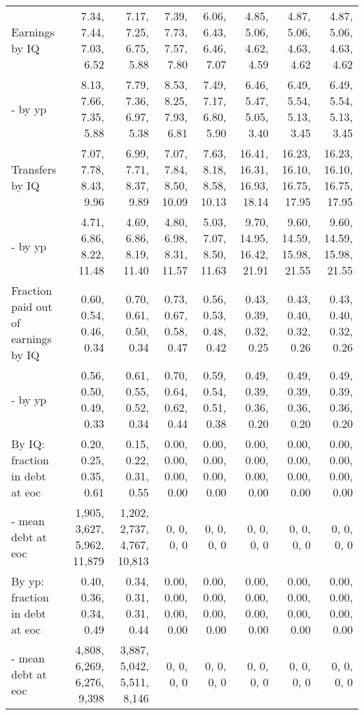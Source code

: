 \begin{tabular}{lrrrrrrr}
Earnings by IQ & 7.34, 7.44, 7.03, 6.52  & 7.17, 7.25, 6.75, 5.88  & 7.39, 7.73, 7.57, 7.80  & 6.06, 6.43, 6.46, 7.07  & 4.85, 5.06, 4.62, 4.59  & 4.87, 5.06, 4.63, 4.62  & 4.87, 5.06, 4.63, 4.62  \\ 
- by yp & 8.13, 7.66, 7.35, 5.88  & 7.79, 7.36, 6.97, 5.38  & 8.53, 8.25, 7.93, 6.81  & 7.49, 7.17, 6.80, 5.90  & 6.46, 5.47, 5.05, 3.40  & 6.49, 5.54, 5.13, 3.45  & 6.49, 5.54, 5.13, 3.45  \\ 
Transfers by IQ & 7.07, 7.78, 8.43, 9.96  & 6.99, 7.71, 8.37, 9.89  & 7.07, 7.84, 8.50, 10.09  & 7.63, 8.18, 8.58, 10.13  & 16.41, 16.31, 16.93, 18.14  & 16.23, 16.10, 16.75, 17.95  & 16.23, 16.10, 16.75, 17.95  \\ 
- by yp & 4.71, 6.86, 8.22, 11.48  & 4.69, 6.86, 8.19, 11.40  & 4.80, 6.98, 8.31, 11.57  & 5.03, 7.07, 8.50, 11.63  & 9.70, 14.95, 16.42, 21.91  & 9.60, 14.59, 15.98, 21.55  & 9.60, 14.59, 15.98, 21.55  \\ 
Fraction paid out of earnings by IQ & 0.60, 0.54, 0.46, 0.34  & 0.70, 0.61, 0.50, 0.34  & 0.73, 0.67, 0.58, 0.47  & 0.56, 0.53, 0.48, 0.42  & 0.43, 0.39, 0.32, 0.25  & 0.43, 0.40, 0.32, 0.26  & 0.43, 0.40, 0.32, 0.26  \\ 
- by yp & 0.56, 0.50, 0.49, 0.33  & 0.61, 0.55, 0.52, 0.34  & 0.70, 0.64, 0.62, 0.44  & 0.59, 0.54, 0.51, 0.38  & 0.49, 0.39, 0.36, 0.20  & 0.49, 0.39, 0.36, 0.20  & 0.49, 0.39, 0.36, 0.20  \\ 
By IQ: fraction in debt at eoc & 0.20, 0.25, 0.35, 0.61  & 0.15, 0.22, 0.31, 0.55  & 0.00, 0.00, 0.00, 0.00  & 0.00, 0.00, 0.00, 0.00  & 0.00, 0.00, 0.00, 0.00  & 0.00, 0.00, 0.00, 0.00  & 0.00, 0.00, 0.00, 0.00  \\ 
- mean debt at eoc & 1,905, 3,627, 5,962, 11,879  & 1,202, 2,737, 4,767, 10,813  & 0, 0, 0, 0  & 0, 0, 0, 0  & 0, 0, 0, 0  & 0, 0, 0, 0  & 0, 0, 0, 0  \\ 
By yp: fraction in debt at eoc & 0.40, 0.36, 0.34, 0.49  & 0.34, 0.31, 0.31, 0.44  & 0.00, 0.00, 0.00, 0.00  & 0.00, 0.00, 0.00, 0.00  & 0.00, 0.00, 0.00, 0.00  & 0.00, 0.00, 0.00, 0.00  & 0.00, 0.00, 0.00, 0.00  \\ 
- mean debt at eoc & 4,808, 6,269, 6,276, 9,398  & 3,887, 5,042, 5,511, 8,146  & 0, 0, 0, 0  & 0, 0, 0, 0  & 0, 0, 0, 0  & 0, 0, 0, 0  & 0, 0, 0, 0  \\ 
\hline
\end{tabular}%
